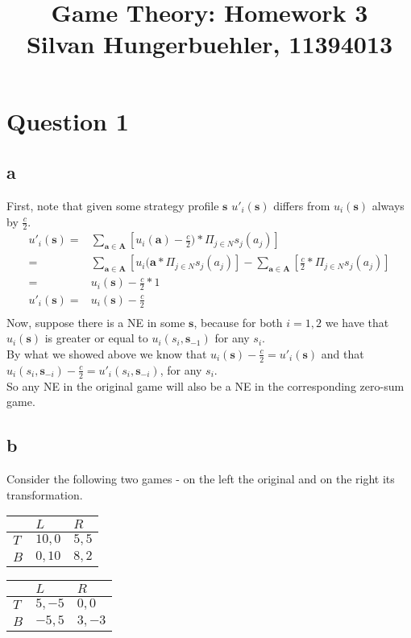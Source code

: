 \documentclass[10pt,a4paper]{article}
\title{%
  Game Theory: Homework 3 \\
  \large Silvan Hungerbuehler, 11394013}
\date{}
\begin{document}
\maketitle

\section*{Question 1}
\subsection*{a}
First, note that given some strategy profile $\boldsymbol{s}$ $u'_i(\boldsymbol{s})$ differs from $u_i(\boldsymbol{s})$ always by $\tfrac{c}{2}$.
\begin{align*}
u'_i(\boldsymbol{s})=&\sum_{\boldsymbol{a}\in \boldsymbol{A}}[u_i(\boldsymbol{a})-\tfrac{c}{2})*\Pi_{j\in N} s_j(a_j)] \\
=&\sum_{\boldsymbol{a}\in \boldsymbol{A}}[u_i(\boldsymbol{a} *\Pi_{j\in N} s_j(a_j)] - \sum_{\boldsymbol{a}\in \boldsymbol{A}}[\tfrac{c}{2} *\Pi_{j\in N} s_j(a_j )] \\
=& u_i(\boldsymbol{s})-\tfrac{c}{2}*1 \\
u'_i(\boldsymbol{s})=& u_i(\boldsymbol{s})-\tfrac{c}{2} \\
\end{align*}
Now, suppose there is a NE in some $\boldsymbol{s}$, because for both $i=1,2$ we have that $u_{i}(\boldsymbol{s})$ is greater or equal to $u_i(s_i,\boldsymbol{s}_{-1})$ for any $s_i$.\\
 By what we showed above we know that $u_{i}(\boldsymbol{s}) - \tfrac{c}{2}=u'_{i}(\boldsymbol{s})$ and that $u_i(s_i, \boldsymbol{s}_{-i}) - \tfrac{c}{2}=u'_{i}(s_i,\boldsymbol{s}_{-i})$, for any $s_i$.\\
So any NE in the original game will also be a NE in the corresponding zero-sum game. 
\subsection*{b}
Consider the following two games - on the left the original and on the right its transformation.
\begin{table}[h]
\centering
\begin{tabular}[l]{|l|l|l|}
\hline
          & $L$ & $R$  \\ \hline
$T$     & $10,0$   & $5,5$ \\ \hline
$B$		& $0,10$	& $8,2$ \\ \hline
\end{tabular}
\quad
\begin{tabular}[r]{|l|l|l|}
\hline
          & $L$ & $R$  \\ \hline
$T$     & $5,-5$   & $0,0$ \\ \hline
$B$		& $-5,5$	& $3,-3$ \\ \hline
\end{tabular}
\end{table}
\end{document}
